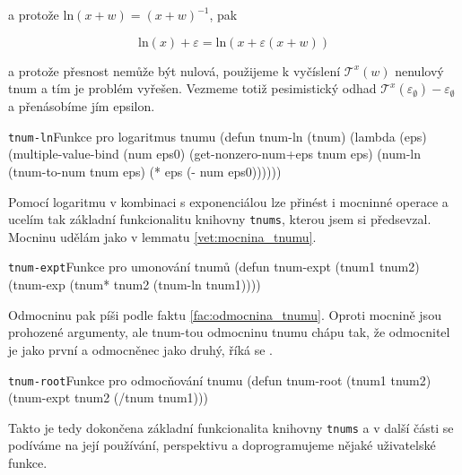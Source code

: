 a protože $\mathrm{ln}(x+w)=(x+w)^{-1}$, pak

\begin{equation}
\mathrm{ln}(x)+\varepsilon=\mathrm{ln}(x+\varepsilon(x+w))
\end{equation}

a protože přesnost nemůže být nulová, použijeme k vyčíslení $\mathcal{T}^x(w)$ nenulový tnum a tím je problém vyřešen. Vezmeme totiž pesimistický odhad $\mathcal{T}^x(\varepsilon_\emptyset)-\varepsilon_\emptyset$ a přenásobíme jím epsilon.

\begin{lispcode}{\texttt{tnum-ln}}{Funkce pro logaritmus tnumu}
(\textcolor{funkcionalni}{defun} \textcolor{pojmenovan}{tnum-ln} (tnum)
  (\textcolor{funkcionalni}{lambda} (eps)
    (\textcolor{matematicke}{multiple-value-bind} (num eps0)
      (\textcolor{moje}{get-nonzero-num+eps} tnum eps)
      (\textcolor{moje}{num-ln} (\textcolor{moje}{tnum-to-num} tnum eps) (\textcolor{matematicke}{*} eps (\textcolor{matematicke}{-} num eps0))))))
\end{lispcode}

\begin{remark}
Pomocí logaritmu v kombinaci s exponenciálou lze přinést i mocninné operace a ucelím tak základní funkcionalitu knihovny \texttt{tnums}, kterou jsem si předsevzal. Mocninu udělám jako v lemmatu \ref{vet:mocnina_tnumu}.
\begin{lispcode}{\texttt{tnum-expt}}{Funkce pro umonování tnumů}
(\textcolor{funkcionalni}{defun} \textcolor{pojmenovan}{tnum-expt} (tnum1 tnum2)
  (\textcolor{moje}{tnum-exp} (\textcolor{moje}{tnum*} tnum2 (\textcolor{moje}{tnum-ln} tnum1))))
\end{lispcode}

Odmocninu pak píši podle faktu \ref{fac:odmocnina_tnumu}. Oproti mocnině jsou prohozené argumenty, ale tnum-tou odmocninu tnumu chápu tak, že odmocnitel je jako první a odmocněnec jako druhý, říká se .

\begin{lispcode}{\texttt{tnum-root}}{Funkce pro odmocňování tnumu}
(\textcolor{funkcionalni}{defun} \textcolor{pojmenovan}{tnum-root} (tnum1 tnum2)
  (\textcolor{moje}{tnum-expt} tnum2 (\textcolor{moje}{/tnum} tnum1)))
\end{lispcode}
\end{remark}

Takto je tedy dokončena základní funkcionalita knihovny \texttt{tnums} a v další části se podíváme na její používání, perspektivu a doprogramujeme nějaké uživatelské funkce.